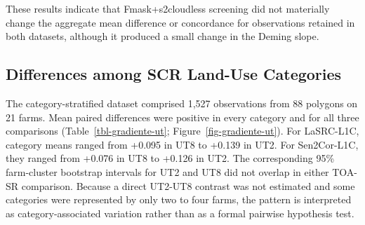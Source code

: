 \documentclass[
  authoryear,
  preprint]{elsarticle}
\begin{document}
These results indicate that Fmask+s2cloudless screening did not
materially change the aggregate mean difference or concordance for
observations retained in both datasets, although it produced a small
change in the Deming slope.

\subsection{Differences among SCR Land-Use
Categories}\label{sec-gradiente-ut}

The category-stratified dataset comprised 1,527 observations from 88
polygons on 21 farms. Mean paired differences were positive in every
category and for all three comparisons (Table~\ref{tbl-gradiente-ut};
Figure~\ref{fig-gradiente-ut}). For LaSRC-L1C, category means ranged
from +0.095 in UT8 to +0.139 in UT2. For Sen2Cor-L1C, they ranged from
+0.076 in UT8 to +0.126 in UT2. The corresponding 95\% farm-cluster
bootstrap intervals for UT2 and UT8 did not overlap in either TOA-SR
comparison. Because a direct UT2-UT8 contrast was not estimated and some
categories were represented by only two to four farms, the pattern is
interpreted as category-associated variation rather than as a formal
pairwise hypothesis test.
\end{document}
